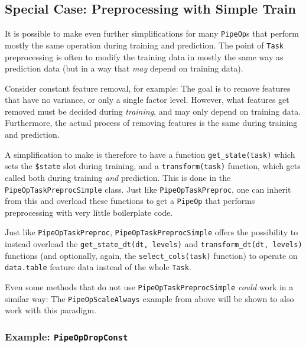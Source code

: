 \documentclass[
  11pt,
  parskip=half,
  DIV=calc,
  BCOR=10mm,
  x11names]{scrbook}
\begin{document}
\hypertarget{special-case-preprocessing-with-simple-train}{%
\subsection{Special Case: Preprocessing with Simple Train}\label{special-case-preprocessing-with-simple-train}}

It is possible to make even further simplifications for many \texttt{PipeOp}s that perform mostly the same operation during training and prediction.
The point of \texttt{Task} preprocessing is often to modify the training data in mostly the same way as prediction data (but in a way that \emph{may} depend on training data).

Consider constant feature removal, for example: The goal is to remove features that have no variance, or only a single factor level.
However, what features get removed must be decided during \emph{training}, and may only depend on training data.
Furthermore, the actual process of removing features is the same during training and prediction.

A simplification to make is therefore to have a function \texttt{get\_state(task)} which sets the \texttt{\$state} slot during training, and a \texttt{transform(task)} function, which gets called both during training \emph{and} prediction.
This is done in the \texttt{PipeOpTaskPreprocSimple} class.
Just like \texttt{PipeOpTaskPreproc}, one can inherit from this and overload these functions to get a \texttt{PipeOp} that performs preprocessing with very little boilerplate code.

Just like \texttt{PipeOpTaskPreproc}, \texttt{PipeOpTaskPreprocSimple} offers the possibility to instead overload the \texttt{get\_state\_dt(dt,\ levels)} and \texttt{transform\_dt(dt,\ levels)} functions (and optionally, again, the \texttt{select\_cols(task)} function) to operate on \texttt{data.table} feature data instead of the whole \texttt{Task}.

Even some methods that do not use \texttt{PipeOpTaskPreprocSimple} \emph{could} work in a similar way: The \texttt{PipeOpScaleAlways} example from above will be shown to also work with this paradigm.

\hypertarget{example-pipeopdropconst}{%
\subsubsection{\texorpdfstring{Example: \texttt{PipeOpDropConst}}{Example: PipeOpDropConst}}\label{example-pipeopdropconst}}
\end{document}
